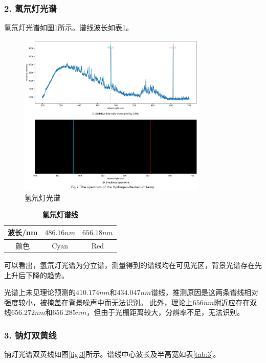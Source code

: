 \documentclass[12pt,a4paper,UTF8]{ctexart}
\begin{document}
\subsubsection*{2. 氢氘灯光谱}
氢氘灯光谱如图\ref{fig:2}所示。谱线波长如表\ref{tab:2}。

\begin{figure}[htbp]
	\centering
	\includegraphics[width=0.8\textwidth]{attachments//Fig.2.png}
	\caption{氢氘灯光谱}
	\label{fig:2}
\end{figure}

\begin{table}[htbp]
	\centering
	\begin{tabular}{ccc}
	\toprule
	波长/nm &$486.16nm$ &$656.18nm$ \\
	\midrule
	颜色 &Cyan &Red  \\
	\bottomrule
    \end{tabular}
    \caption{\textbf{氢氘灯谱线}}
    \label{tab:2}
\end{table}

可以看出，氢氘灯光谱为分立谱，测量得到的谱线均在可见光区，背景光谱存在先上升后下降的趋势。

光谱上未见理论预测的$410.174nm$和$434.047nm$谱线，推测原因是这两条谱线相对强度较小，被掩盖在背景噪声中而无法识别。
此外，理论上$656nm$附近应存在双线$656.272nm$和$656.285nm$，但由于光栅距离较大，分辨率不足，无法识别。

\subsubsection*{3. 钠灯双黄线}
钠灯光谱双黄线如图\ref{fig:3}所示。谱线中心波长及半高宽如表\ref{tab:3}。
\end{document}

